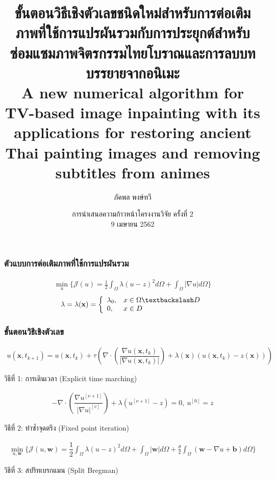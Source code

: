 \documentclass[xcolor=dvipsnames, xetex,serif]{beamer}
\title[วิธีเชิงตัวเลขสำหรับต่อเติมภาพ]{\normalsize{ขั้นตอนวิธีเชิงตัวเลขชนิดใหม่สำหรับการต่อเติมภาพที่ใช้การแปรผันรวมกับการประยุกต์สำหรับซ่อมแซมภาพจิตรกรรมไทยโบราณและการลบบทบรรยายจากอนิเมะ\\A new numerical algorithm for TV-based image inpainting with its applications for restoring ancient Thai painting images and removing subtitles from animes}}
\author[ภัคพล]{ภัคพล พงษ์ทวี}
\institute[SU]{
 	ภาควิชาคณิตศาสตร์\\
 	มหาวิทยาลัยศิลปากร \\}
\date[Project Progression]{การนำเสนอความก้าวหน้าโครงงานวิจัย ครั้งที่ 2\\
 	9 เมษายน 2562}
\numberwithin{equation}{section}
\begin{document}
	\begin{frame}
 		\titlepage 
	\end{frame}	 
	\begin{frame}
		\frametitle{ตัวแบบการต่อเติมภาพที่ใช้การแปรผันรวม}
		\begin{align*}
		\min_{u} \{ \mathcal{J}(u) = \frac{1}{2} \int_{\Omega}\lambda (u-z)^2 d\Omega +  \int_{\Omega}  |\nabla u|  d\Omega \}
		\end{align*}
		 \vspace{1cm}
		\begin{align*}
		\lambda=\lambda(\mathbf{x}) = \left \{ \begin{array}{ll}  \lambda_0, & x \in \Omega \textbackslash D \\ 0, & x \in D  \end{array} \right . 
		\end{align*}
		\let\thefootnote\relax{}	
	\end{frame} 
	\begin{frame}
		\frametitle{ขั้นตอนวิธีเชิงตัวเลข}
		\begin{align*}
			u(\mathbf{x},t_{k+1})=u(\mathbf{x},t_{k})+\tau\left(\nabla \cdot\left(\dfrac{\nabla u (\mathbf{x},t_k)}{| \nabla u (\mathbf{x},t_k) | }\right) + \lambda(\mathbf{x})(u (\mathbf{x},t_k)-z(\mathbf{x})) \right)
		\end{align*}
		\begin{center}
		\textcolor{PineGreen}{วิธีที่ 1:} การเดินเวลา (Explicit time marching)
		\end{center}
		\begin{align*}
			- \nabla\cdot\left(\dfrac{\nabla u^{[\nu+1]}}{{| \nabla u |}^{[v]} }\right) + \lambda(u^{[\nu+1]}-z)  = 0,\ u^{[0]}=z
		\end{align*}
		\begin{center}
			\textcolor{PineGreen}{วิธีที่ 2:} ทำซ้ำจุดตรึง (Fixed point iteration)
		\end{center}
		\begin{align*}
			\min_{u,\boldsymbol{w}} \{ \mathcal{J}(u,\boldsymbol{w}) = \dfrac{1}{2} \int_{\Omega} \lambda(u-z)^2 d\Omega +  \int_{\Omega}  |\boldsymbol{w}|  d\Omega + \frac{\theta}{2} \int_{\Omega} (\boldsymbol{w} - \nabla u + \boldsymbol{b}) d\Omega \}
		\end{align*}
		\begin{center}
			\textcolor{PineGreen}{วิธีที่ 3:} สปริทเบรกแมน (Split Bregman)
		\end{center}
	\end{frame} 
\end{document}
